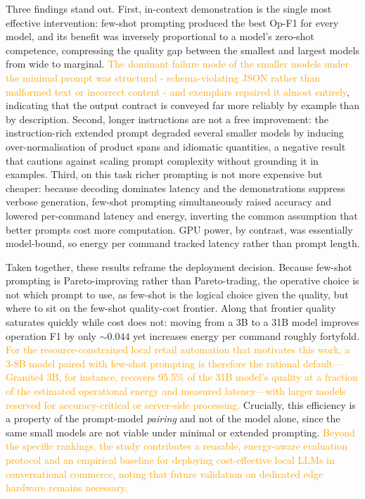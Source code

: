 \documentclass[journal,article,submit,pdftex,moreauthors]{Definitions/mdpi}
\begin{document}
Three findings stand out. First, in-context demonstration is the single most effective intervention: few-shot prompting produced the best Op-F1 for every model, and its benefit was inversely proportional to a model's zero-shot competence, compressing the quality gap between the smallest and largest models from wide to marginal. \textcolor{orange}{The dominant failure mode of the smaller models under the minimal prompt was structural - schema-violating JSON rather than malformed text or incorrect content - and exemplars repaired it almost entirely}, indicating that the output contract is conveyed far more reliably by example than by description. Second, longer instructions are not a free improvement: the instruction-rich extended prompt degraded several smaller models by inducing over-normalisation of product spans and idiomatic quantities, a negative result that cautions against scaling prompt complexity without grounding it in examples. Third, on this task richer prompting is not more expensive but cheaper: because decoding dominates latency and the demonstrations suppress verbose generation, few-shot prompting simultaneously raised accuracy and lowered per-command latency and energy, inverting the common assumption that better prompts cost more computation. GPU power, by contrast, was essentially model-bound, so energy per command tracked latency rather than prompt length.

Taken together, these results reframe the deployment decision. Because few-shot prompting is Pareto-improving rather than Pareto-trading, the operative choice is not which prompt to use, as few-shot is the logical choice given the quality, but where to sit on the few-shot quality-cost frontier. Along that frontier quality saturates quickly while cost does not: moving from a 3B to a 31B model improves operation F1 by only ${\sim}0.044$ yet increases energy per command roughly fortyfold. \textcolor{orange}{For the resource-constrained local retail automation that motivates this work, a 3-8B model paired with few-shot prompting is therefore the rational default---Granite4 3B, for instance, recovers 95.5\% of the 31B model's quality at a fraction of the estimated operational energy and measured latency---with larger models reserved for accuracy-critical or server-side processing.} Crucially, this efficiency is a property of the prompt-model \emph{pairing} and not of the model alone, since the same small models are not viable under minimal or extended prompting. \textcolor{orange}{Beyond the specific rankings, the study contributes a reusable, energy-aware evaluation protocol and an empirical baseline for deploying cost-effective local LLMs in conversational commerce, noting that future validation on dedicated edge hardware remains necessary.}
\end{document}
